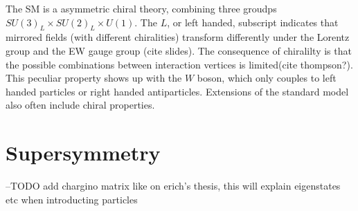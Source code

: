 The SM is a asymmetric chiral theory, combining three groudps $SU(3)_L \times SU(2)_L \times U(1)$. The $L$, or left handed, subscript indicates that mirrored fields (with different chiralities)  transform differently under the Lorentz group and the EW gauge group (cite slides).  The consequence of chiralilty is that the possible combinations between interaction vertices is limited(cite thompson?). This peculiar property shows up with the $W$ boson, which only couples to left handed particles or right handed antiparticles. Extensions of the standard model also often include chiral properties.  %

\section{Supersymmetry}

--TODO add chargino matrix like on erich's thesis, this will explain eigenstates etc when introducting particles

